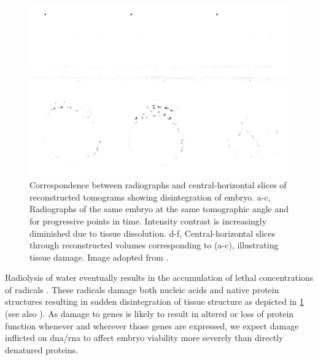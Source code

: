 \documentclass[
twoside,
openright,
titlepage,
numbers=noenddot,
headinclude,
fleqn,
a4paper,
footinclude=true,
cleardoublepage=empty,
abstractoff,
BCOR=5mm,
paper=a4,
fontsize=11pt,
british,ngerman,american,
]{scrreprt}
\begin{document}
\begin{figure}
  \centering
  \includegraphics[width=0.99\textwidth]
{figures/NatProtoc/EmbryonicDissolution_ProjectionAndVolumeSlices.png}
\caption[Correspondence between radiographs and central-horizontal
slices of reconstructed tomograms, and disintegration of embryonic
compound.]{%
  Correspondence between radiographs and central-horizontal slices of
  reconstructed tomograms showing disintegration of embryo.  a-c,
  Radiographs of the same embryo at the same tomographic angle and for
  progressive points in time.  Intensity contrast is increasingly
  diminished due to tissue dissolution.  d-f, Central-horizontal
  slices through reconstructed volumes corresponding to (a-c),
  illustrating tissue damage.  Image adopted from
  \cite{Moosmann2014natp}.}
  \label{fig:disintegration}
\end{figure}
Radiolysis of water eventually results in the accumulation of lethal
concentrations of radicals \cite{Kueltz2005}.  These radicals damage
both nucleic acids and native protein structures resulting in sudden
disintegration of tissue structure as depicted in
\cref{fig:disintegration} (see also \cite{Moosmann2013nature}).  As
damage to genes is likely to result in altered or loss of protein
function whenever and wherever those genes are expressed, we expect
damage inflicted on \acs{dna}/\ac{rna} to affect embryo viability more
severely than directly denatured proteins.


\end{document}
